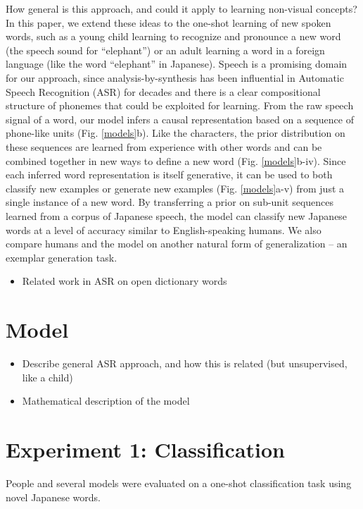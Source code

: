 \documentclass[10pt,letterpaper]{article}
\begin{document}
How general is this approach, and could it apply to learning non-visual concepts? In this paper, we extend these ideas to the one-shot learning of new spoken words, such as a young child learning to recognize and pronounce a new word (the speech sound for ``elephant'') or an adult learning a word in a foreign language (like the word ``elephant'' in Japanese). Speech is a promising domain for our approach, since analysis-by-synthesis has been influential in Automatic Speech Recognition (ASR) for decades \cite{Halle1962,Liberman1967} and there is a clear compositional structure of phonemes that could be exploited for learning. From the raw speech signal of a word, our model infers a causal representation based on a sequence of phone-like units (Fig. \ref{models}b). Like the characters, the prior distribution on these sequences are learned from experience with other words and can be combined together in new ways to define a new word (Fig. \ref{models}b-iv). Since each inferred word representation is itself generative, it can be used to both classify new examples or generate new examples (Fig. \ref{models}a-v) from just a single instance of a new word. By transferring a prior on sub-unit sequences learned from a corpus of Japanese speech, the model can classify new Japanese words at a level of accuracy similar to English-speaking humans. We also compare humans and the model on another natural form of generalization -- an exemplar generation task.



\begin{itemize}
	\item Related work in ASR on open dictionary words
\end{itemize}

\section{Model}

\begin{itemize}
\item Describe general ASR approach, and how this is related (but unsupervised, like a child)
\item Mathematical description of the model
\end{itemize}

\section{Experiment 1: Classification}
People and several models were evaluated on a one-shot classification task using novel Japanese words. 
\end{document}
